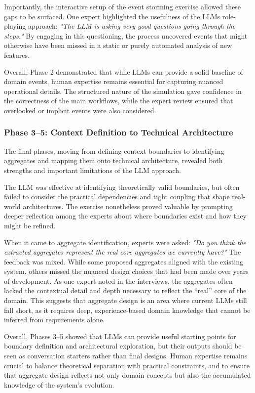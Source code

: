 Importantly, the interactive setup of the event storming exercise allowed these gaps to be surfaced. One expert highlighted the usefulness of the LLMs role-playing approach: \textit{"The LLM is asking very good questions going through the steps."} By engaging in this questioning, the process uncovered events that might otherwise have been missed in a static or purely automated analysis of new features.  

Overall, Phase 2 demonstrated that while LLMs can provide a solid baseline of domain events, human expertise remains essential for capturing nuanced operational details. The structured nature of the simulation gave confidence in the correctness of the main workflows, while the expert review ensured that overlooked or implicit events were also considered. 

\subsubsection{Phase 3--5: Context Definition to Technical Architecture}
The final phases, moving from defining context boundaries to identifying aggregates and mapping them onto technical architecture, revealed both strengths and important limitations of the LLM approach.  

The LLM was effective at identifying theoretically valid boundaries, but often failed to consider the practical dependencies and tight coupling that shape real-world architectures. The exercise nonetheless proved valuable by prompting deeper reflection among the experts about where boundaries exist and how they might be refined.  

When it came to aggregate identification, experts were asked: \textit{"Do you think the extracted aggregates represent the real core aggregates we currently have?"} The feedback was mixed. While some proposed aggregates aligned with the existing system, others missed the nuanced design choices that had been made over years of development. As one expert noted in the interviews, the aggregates often lacked the contextual detail and depth necessary to reflect the “real” core of the domain. This suggests that aggregate design is an area where current LLMs still fall short, as it requires deep, experience-based domain knowledge that cannot be inferred from requirements alone.  

Overall, Phases 3--5 showed that LLMs can provide useful starting points for boundary definition and architectural exploration, but their outputs should be seen as conversation starters rather than final designs. Human expertise remains crucial to balance theoretical separation with practical constraints, and to ensure that aggregate design reflects not only domain concepts but also the accumulated knowledge of the system's evolution.

